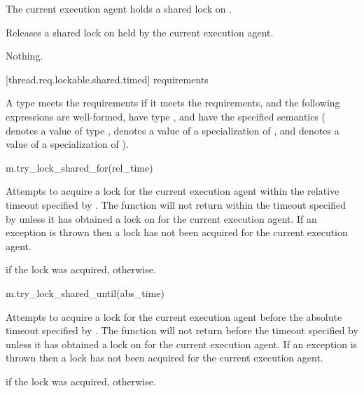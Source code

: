 \begin{itemdescr}
\pnum
\expects
The current execution agent holds a shared lock on .

\pnum
\effects
Releases a shared lock on  held by the current execution agent.

\pnum
\throws
Nothing.
\end{itemdescr}

[thread.req.lockable.shared.timed]{ requirements}

\pnum
A type  meets the  requirements if
it meets the  requirements, and
the following expressions are well-formed, have type , and
have the specified semantics
( denotes a value of type ,
 denotes a value of a specialization of , and
 denotes a value of a specialization of ).

\begin{itemdecl}
m.try_lock_shared_for(rel_time)
\end{itemdecl}

\begin{itemdescr}
\pnum
\effects
Attempts to acquire a lock for the current execution agent within
the relative timeout specified by .
The function will not return within the timeout specified by 
unless it has obtained a lock on  for the current execution agent.
If an exception is thrown then a lock has not been acquired for
the current execution agent.

\pnum
\returns
{} if the lock was acquired,  otherwise.
\end{itemdescr}

\begin{itemdecl}
m.try_lock_shared_until(abs_time)
\end{itemdecl}

\begin{itemdescr}
\pnum
\effects
Attempts to acquire a lock for the current execution agent before
the absolute timeout specified by .
The function will not return before the timeout specified by 
unless it has obtained a lock on  for the current execution agent.
If an exception is thrown then a lock has not been acquired for
the current execution agent.

\pnum
\returns
{} if the lock was acquired,  otherwise.
\end{itemdescr}

